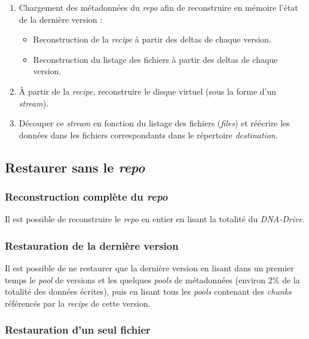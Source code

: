 \documentclass[a4paper,twocolumn]{article}
\begin{document}
\begin{enumerate}
\item
  Chargement des métadonnées du \emph{repo} afin de reconstruire en
  mémoire l'état de la dernière version :

  \begin{itemize}
  \item
    Reconstruction de la \emph{recipe} à partir des deltas de chaque
    version.
  \item
    Reconstruction du listage des fichiers à partir des deltas de chaque
    version.
  \end{itemize}
\item
  À partir de la \emph{recipe}, reconstruire le disque virtuel (sous la
  forme d'un \emph{stream}).
\item
  Découper ce \emph{stream} en fonction du listage des fichiers
  (\emph{files}) et réécrire les données dans les fichiers
  correspondants dans le répertoire \emph{destination}.
\end{enumerate}

\subsection{\texorpdfstring{Restaurer sans le
\emph{repo}}{Restaurer sans le repo}}

\subsubsection{\texorpdfstring{Reconstruction complète du
\emph{repo}}{Reconstruction complète du repo}}

Il est possible de reconstruire le \emph{repo} en entier en lisant la
totalité du \emph{DNA-Drive}.

\subsubsection{Restauration de la dernière
version}

Il est possible de ne restaurer que la dernière version en lisant dans
un premier temps le \emph{pool} de versions et les quelques \emph{pools}
de métadonnées (environ 2\% de la totalité des données écrites), puis en
lisant tous les \emph{pools} contenant des \emph{chunks} référencés par
la \emph{recipe} de cette version.

\subsubsection{Restauration d'un seul
fichier}
\end{document}
